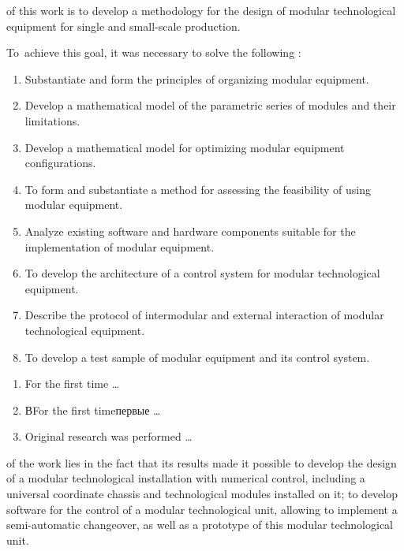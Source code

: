 
{\aimEn} of this work is to develop a methodology for the design of modular technological equipment for single and small-scale production.

To~achieve this goal, it was necessary to solve the following {\tasksEn}:
\begin{enumerate}[beginpenalty=10000] %
	\item Substantiate and form the principles of organizing modular equipment.
	\item Develop a mathematical model of the parametric series of modules and their limitations.
	\item Develop a mathematical model for optimizing modular equipment configurations.
	\item To form and substantiate a method for assessing the feasibility of using modular equipment.
	\item Analyze existing software and hardware components suitable for the implementation of modular equipment.
	\item To develop the architecture of a control system for modular technological equipment.
	\item Describe the protocol of intermodular and external interaction of modular technological equipment.
	\item To develop a test sample of modular equipment and its control system.
\end{enumerate}


{\noveltyEn}
\begin{enumerate}[beginpenalty=10000] %
  \item For the first time \ldots
  \item ВFor the first timeпервые \ldots
  \item Original research was performed \ldots
\end{enumerate}

{\influenceEn} of the work lies in the fact that its results made it possible to develop the design of a modular technological installation with numerical control, including a universal coordinate chassis and technological modules installed on it; to develop software for the control of a modular technological unit, allowing to implement a semi-automatic changeover, as well as a prototype of this modular technological unit.

